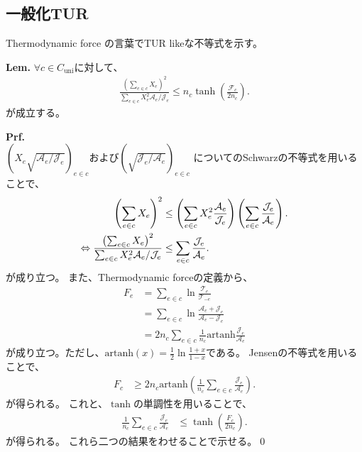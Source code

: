\documentclass[a4paper,11pt]{jsarticle}
\numberwithin{equation}{section}
\begin{document}
\subsection{一般化TUR}
Thermodynamic force の言葉でTUR likeな不等式を示す。
\begin{itembox}[l]{\textbf{Lem.}}
    $\forall c \in C_{\text{uni}}$に対して、
    \begin{align}
        \frac{\left( \sum_{e \in c} X_e \right)^2}{\sum_{e \in c} X_e^2 \mathcal{A}_e / \mathcal{J}_e}
\leq n_c \tanh\left( \frac{\mathcal{F}_c}{2 n_c} \right).
    \end{align}
    が成立する。
\end{itembox}
\textbf{Prf.}\\
$(X_{e}\sqrt{\mathcal{A}_e / \mathcal{J}_e} )_{e \in c}$および$(\sqrt{\mathcal{J}_e / \mathcal{A}_e}) _{e \in c}$
についてのSchwarzの不等式を用いることで、
\begin{align}
    \qty(\sum_{e \in c} X_e)^2 
&\leq \left( \sum_{e \in c} X_e^2 \frac{\mathcal{A}_e}{\mathcal{J}_e} \right) \left( \sum_{e \in c} \frac{\mathcal{J}_e}{\mathcal{A}_e} \right).\\
\Leftrightarrow \frac{\qty(\sum_{e \in c} X_e)^2}{\sum_{e \in c} X_e^2 \mathcal{A}_e / \mathcal{J}_e}
&\leq \sum_{e \in c} \frac{\mathcal{J}_e}{\mathcal{A}_e}.
\end{align}
が成り立つ。
また、Thermodynamic forceの定義から、
\begin{align}
    F_{e} &= \sum_{e \in c} \ln \frac{\mathcal{T}_e}{\mathcal{T}_{-e}} \\
    &= \sum_{e \in c} \ln \frac{\mathcal{A}_e + \mathcal{J}_e}{\mathcal{A}_e - \mathcal{J}_e}\\
    &= 2n_{c} \sum_{e \in c} \frac{1}{n_c} \mathrm{artanh} \frac{\mathcal{J}_e}{\mathcal{A}_e}
\end{align}
が成り立つ。ただし、$\text{artanh}(x) = \frac{1}{2} \ln \frac{1+x}{1-x}$である。
Jensenの不等式を用いることで、
\begin{align}
    F_{c} &\geq 2 n_c \mathrm{artanh} \left( \frac{1}{n_c} \sum_{e \in c} \frac{\mathcal{J}_e}{\mathcal{A}_e} \right).
\end{align}
が得られる。
これと、$\tanh$の単調性を用いることで、
\begin{align}
    \frac{1}{n_c} \sum_{e \in c} \frac{\mathcal{J}_e}{\mathcal{A}_e}
&\leq \tanh\left( \frac{F_c}{2 n_c} \right).
\end{align}
が得られる。
これら二つの結果をわせることで示せる。\qed\\
\end{document}
